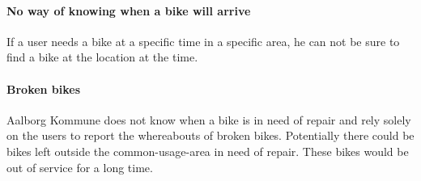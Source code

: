 \paragraph{No way of knowing when a bike will arrive}
If a user needs a bike at a specific time in a specific area, he can not be sure to find a bike at the location at the time.

\paragraph{Broken bikes}
Aalborg Kommune does not know when a bike is in need of repair and rely solely on the users to report the whereabouts of broken bikes.
Potentially there could be bikes left outside the common-usage-area in need of repair. These bikes would be out of service for a long time.
